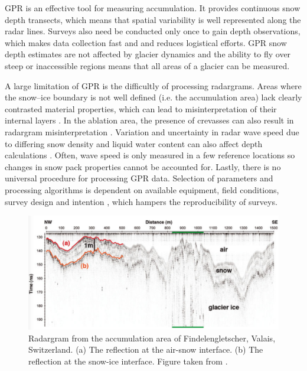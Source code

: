 \documentclass[12pt]{article}
\begin{document}
GPR is an effective tool for measuring accumulation. It provides continuous snow depth transects, which means that spatial variability is well represented along the radar lines. Surveys also need be conducted only once to gain depth observations, which makes data collection fast and and reduces logistical efforts\citep{Machguth2006}. GPR snow depth estimates are not affected by glacier dynamics and the ability to fly over steep or inaccessible regions means that all areas of a glacier can be measured. 

A large limitation of GPR is the difficultly of processing radargrams. Areas where the snow--ice boundary is not well defined (i.e. the accumulation area) lack clearly contrasted material properties, which can lead to misinterpretation of their internal layers \citep{McGrath2015}. In the ablation area, the presence of crevasses can also result in radargram misinterpretation \citep{Machguth2006}. Variation and uncertainty in radar wave speed due to differing snow density and liquid water content can also affect depth calculations \citep{Sold2013}. Often, wave speed is only measured in a few reference locations so changes in snow pack properties cannot be accounted for. Lastly, there is no universal procedure for processing GPR data. Selection of parameters and processing algorithms is dependent on available equipment, field conditions, survey design and intention \citep{Sold2013}, which hampers the reproducibility of surveys.

\begin{figure}
 \centering
      \includegraphics[width=\textwidth]{gpr.png}
  \caption{Radargram from the accumulation area of Findelengletscher, Valais, Switzerland. (a) The reflection at the air-snow interface. (b) The reflection at the snow-ice interface. Figure taken from \cite{Sold2013}.}
        \label{gpr}
\end{figure}
\end{document}
